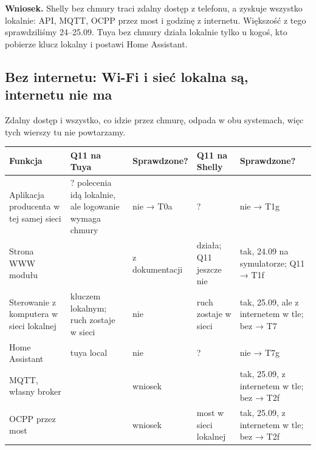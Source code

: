 \documentclass[11pt,a4paper]{article}
\begin{document}
\textbf{Wniosek.} Shelly bez chmury traci zdalny dostęp z telefonu, a zyskuje wszystko lokalnie: API, MQTT, OCPP przez most i godzinę z internetu. Większość z tego sprawdziliśmy 24–25.09. Tuya bez chmury działa lokalnie tylko u kogoś, kto pobierze klucz lokalny i postawi Home Assistant.


\subsection{Bez internetu: Wi-Fi i sieć lokalna są, internetu nie ma}

Zdalny dostęp i wszystko, co idzie przez chmurę, odpada w obu systemach, więc tych wierszy tu nie powtarzamy.


\begin{longtable}{>{\raggedright\arraybackslash}p{3.54cm}>{\raggedright\arraybackslash}p{2.52cm}>{\raggedright\arraybackslash}p{2.35cm}>{\raggedright\arraybackslash}p{2.94cm}>{\raggedright\arraybackslash}p{3.05cm}}
\toprule
\rowcolor{apteallight}\textbf{Funkcja} & \textbf{Q11 na Tuya} & \textbf{Sprawdzone?} & \textbf{Q11 na Shelly} & \textbf{Sprawdzone?} \\
\midrule\endhead
\bottomrule\endfoot
Aplikacja producenta w tej samej sieci & ? polecenia idą lokalnie, ale logowanie wymaga chmury & nie {\symbolfont→} T0a & ? & nie {\symbolfont→} T1g \\
Strona WWW modułu & \leavevmode{\symbolfont\color{apred}\textbf{✘}} & z dokumentacji & \leavevmode{\symbolfont\color{apamber}\textbf{◐}} działa; Q11 jeszcze nie & tak, 24.09 na symulatorze; Q11 {\symbolfont→} T1f \\
Sterowanie z komputera w sieci lokalnej & \leavevmode{\symbolfont\color{apamber}\textbf{◐}} kluczem lokalnym; ruch zostaje w sieci & nie & \leavevmode{\symbolfont\color{apgreen}\textbf{✔}} ruch zostaje w sieci & tak, 25.09, ale z internetem w tle; bez {\symbolfont→} T7 \\
Home Assistant & \leavevmode{\symbolfont\color{apamber}\textbf{◐}} tuya local & nie & ? & nie {\symbolfont→} T7g \\
MQTT, własny broker & \leavevmode{\symbolfont\color{apred}\textbf{✘}} & wniosek & \leavevmode{\symbolfont\color{apgreen}\textbf{✔}} & tak, 25.09, z internetem w tle; bez {\symbolfont→} T2f \\
OCPP przez most & \leavevmode{\symbolfont\color{apred}\textbf{✘}} & wniosek & \leavevmode{\symbolfont\color{apamber}\textbf{◐}} most w sieci lokalnej & tak, 25.09, z internetem w tle; bez {\symbolfont→} T2f \\

\end{longtable}
\end{document}

